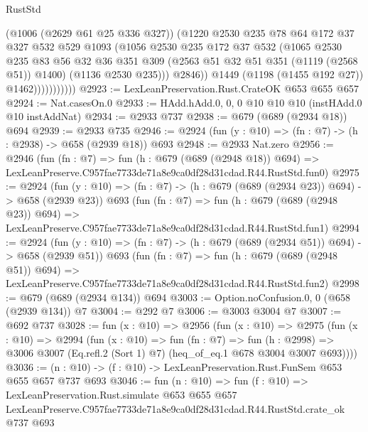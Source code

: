 \begin{lexlean}{RustStd}
\begin{coremodule}
                            (@1006 (@2629 @61 @25 @336 @327))
                            (@1220
                              @2530
                              @235
                              @78
                              @64
                              @172
                              @37
                              @327
                              @532
                              @529
                              @1093
                              (@1056
                                @2530
                                @235
                                @172
                                @37
                                @532
                                (@1065
                                  @2530
                                  @235
                                  @83
                                  @56
                                  @32
                                  @36
                                  @351
                                  @309
                                  (@2563 @51 @32 @51 @351 (@1119 (@2568 @51)) @1400)
                                  (@1136 @2530 @235)))
                              @2846))
                          @1449
                          (@1198 (@1455 @192 @27))
                          @1462)))))))))))
@2923 := LexLeanPreservation.Rust.CrateOK @653 @655 @657
@2924 := Nat.casesOn.{0}
@2933 := HAdd.hAdd.{0, 0, 0} @10 @10 @10 (instHAdd.{0} @10 instAddNat)
@2934 := @2933 @737
@2938 := @679 (@689 (@2934 @18)) @694
@2939 := @2933 @735
@2946 := @2924 (fun (y : @10) => (fn : @7) -> (h : @2938) -> @658 (@2939 @18)) @693
@2948 := @2933 Nat.zero
@2956 := @2946
    (fun (fn : @7) =>
    fun (h : @679 (@689 (@2948 @18)) @694) =>
    LexLeanPreserve.C957fae7733de71a8e9ca0df28d31cdad.R44.RustStd.fun0)
@2975 := @2924
    (fun (y : @10) => (fn : @7) -> (h : @679 (@689 (@2934 @23)) @694) -> @658 (@2939 @23))
    @693
    (fun (fn : @7) =>
    fun (h : @679 (@689 (@2948 @23)) @694) =>
    LexLeanPreserve.C957fae7733de71a8e9ca0df28d31cdad.R44.RustStd.fun1)
@2994 := @2924
    (fun (y : @10) => (fn : @7) -> (h : @679 (@689 (@2934 @51)) @694) -> @658 (@2939 @51))
    @693
    (fun (fn : @7) =>
    fun (h : @679 (@689 (@2948 @51)) @694) =>
    LexLeanPreserve.C957fae7733de71a8e9ca0df28d31cdad.R44.RustStd.fun2)
@2998 := @679 (@689 (@2934 @134)) @694
@3003 := Option.noConfusion.{0, 0} (@658 (@2939 @134)) @7
@3004 := @292 @7
@3006 := @3003 @3004 @7
@3007 := @692 @737
@3028 := fun (x : @10) =>
  @2956
    (fun (x : @10) =>
    @2975
      (fun (x : @10) =>
      @2994
        (fun (x : @10) =>
        fun (fn : @7) =>
        fun (h : @2998) =>
        @3006 @3007 (Eq.refl.{2} (Sort 1) @7) (heq_of_eq.{1} @678 @3004 @3007 @693))))
@3036 := (n : @10) -> (f : @10) -> LexLeanPreservation.Rust.FunSem @653 @655 @657 @737 @693
@3046 := fun (n : @10) =>
  fun (f : @10) =>
  LexLeanPreservation.Rust.simulate
    @653
    @655
    @657
    LexLeanPreserve.C957fae7733de71a8e9ca0df28d31cdad.R44.RustStd.crate_ok
    @737
    @693
\end{coremodule}
\end{lexlean}
